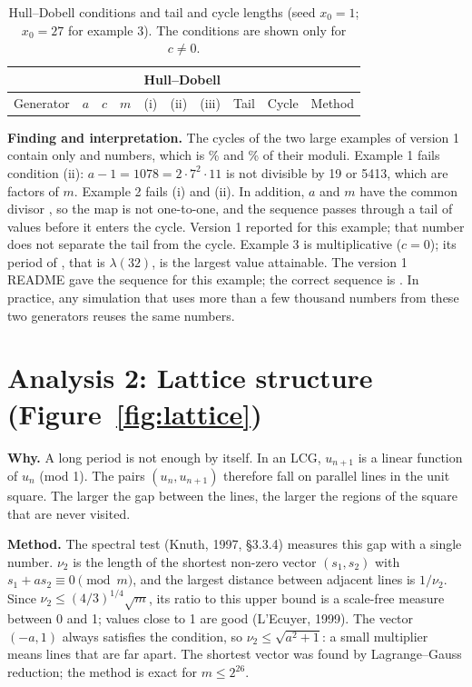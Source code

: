 \documentclass[11pt,a4paper]{article}
\begin{document}
\begin{table}[h]
\centering\footnotesize\setlength{\tabcolsep}{4pt}
\caption{Hull--Dobell conditions and tail and cycle lengths (seed $x_0=1$; $x_0=27$ for example 3). The conditions are shown
only for $c\ne0$.}\label{tab:period}
\scriptsize\setlength{\tabcolsep}{1.8pt}
\begin{tabular}{@{}>{\raggedright\arraybackslash}p{1.5cm}rrlccccr>{\raggedright\arraybackslash}p{1.45cm}@{}}
\toprule
 & & & & \multicolumn{3}{c}{Hull--Dobell} & & & \\
\cmidrule(lr){5-7}
Generator & $a$ & $c$ & $m$ & (i) & (ii) & (iii) & Tail & Cycle & Method \\
\midrule

\end{tabular}
\end{table}

\textbf{Finding and interpretation.} The cycles of the two large examples of version 1 contain only \ExOnePeriod{} and
\ExTwoPeriod{} numbers, which is \ExOneShare\% and \ExTwoShare\% of their moduli. Example 1 fails condition (ii):
$a-1 = 1078 = 2\cdot7^2\cdot11$ is not divisible by 19 or 5413, which are factors of $m$. Example 2 fails (i) and (ii). In
addition, $a$ and $m$ have the common divisor \ExTwoGcd{}, so the map is not one-to-one, and the sequence passes through a tail
of \ExTwoTail{} values before it enters the cycle. Version 1 reported \VOneStepTwo{} for this example; that number does not
separate the tail from the cycle. Example 3 is multiplicative ($c=0$); its period of \ExThreePeriod{}, that is $\lambda(32)$, is
the largest value attainable. The version 1 README gave the sequence \ReadmeStated{} for this example; the correct sequence is
\ReadmeComputed. In practice, any simulation that uses more than a few thousand numbers from these two generators reuses the
same numbers.

\section{Analysis 2: Lattice structure (Figure~\ref{fig:lattice})}

\textbf{Why.} A long period is not enough by itself. In an LCG, $u_{n+1}$ is a linear function of $u_n$ (mod 1). The pairs
$(u_n, u_{n+1})$ therefore fall on parallel lines in the unit square. The larger the gap between the lines, the larger the
regions of the square that are never visited.

\textbf{Method.} The spectral test (Knuth, 1997, §3.3.4) measures this gap with a single number. $\nu_2$ is the length of the
shortest non-zero vector $(s_1,s_2)$ with $s_1 + a s_2 \equiv 0 \pmod m$, and the largest distance between adjacent lines is
$1/\nu_2$. Since $\nu_2 \le (4/3)^{1/4}\sqrt{m}$, its ratio to this upper bound is a scale-free measure between 0 and 1; values
close to 1 are good (L'Ecuyer, 1999). The vector $(-a, 1)$ always satisfies the condition, so $\nu_2 \le \sqrt{a^2+1}$: a small
multiplier means lines that are far apart. The shortest vector was found by Lagrange--Gauss reduction; the method is exact for
$m \le 2^{26}$.
\end{document}
